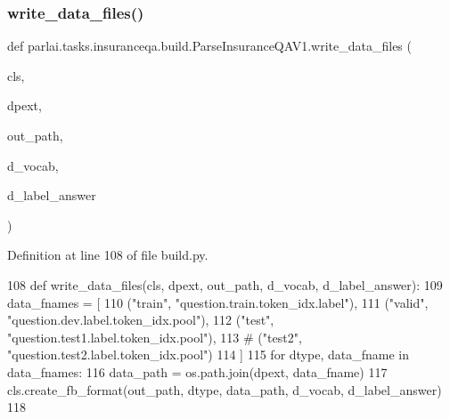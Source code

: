 \mbox{\label{classparlai_1_1tasks_1_1insuranceqa_1_1build_1_1ParseInsuranceQAV1_aec860cdc7404febddbbc3434828c74e3}} 
\subsubsection{\texorpdfstring{write\+\_\+data\+\_\+files()}{write\_data\_files()}}
{\footnotesize\ttfamily def parlai.\+tasks.\+insuranceqa.\+build.\+Parse\+Insurance\+Q\+A\+V1.\+write\+\_\+data\+\_\+files (\begin{DoxyParamCaption}\item[{}]{cls,  }\item[{}]{dpext,  }\item[{}]{out\+\_\+path,  }\item[{}]{d\+\_\+vocab,  }\item[{}]{d\+\_\+label\+\_\+answer }\end{DoxyParamCaption})}



Definition at line 108 of file build.\+py.


\begin{DoxyCode}
108     \textcolor{keyword}{def }write\_data\_files(cls, dpext, out\_path, d\_vocab, d\_label\_answer):
109         data\_fnames = [
110             (\textcolor{stringliteral}{"train"}, \textcolor{stringliteral}{"question.train.token\_idx.label"}),
111             (\textcolor{stringliteral}{"valid"}, \textcolor{stringliteral}{"question.dev.label.token\_idx.pool"}),
112             (\textcolor{stringliteral}{"test"}, \textcolor{stringliteral}{"question.test1.label.token\_idx.pool"}),
113             \textcolor{comment}{# ("test2", "question.test2.label.token\_idx.pool")}
114         ]
115         \textcolor{keywordflow}{for} dtype, data\_fname \textcolor{keywordflow}{in} data\_fnames:
116             data\_path = os.path.join(dpext, data\_fname)
117             cls.create\_fb\_format(out\_path, dtype, data\_path, d\_vocab, d\_label\_answer)
118 
\end{DoxyCode}


